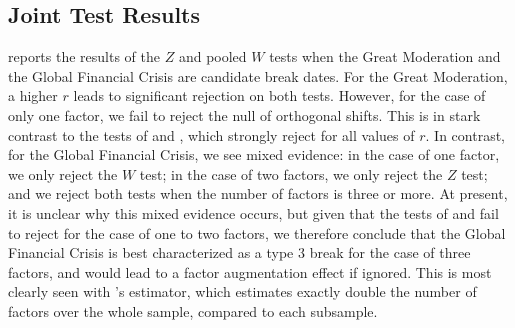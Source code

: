 \documentclass[12pt]{article}
\theoremstyle{plain}
\numberwithin{equation}{section}
\begin{document}
\subsection{Joint Test Results}
 reports the results of the $Z$ and pooled $W$ tests when the Great Moderation and the Global Financial Crisis are candidate break dates. For the Great Moderation, a higher $r$ leads to significant rejection on both tests. However, for the case of only one factor, we fail to reject the null of orthogonal shifts. This is in stark contrast to the tests of \textcite{han_tests_2015} and \textcite{baltagi_estimating_2021}, which strongly reject for all values of $r$. In contrast, for the Global Financial Crisis, we see mixed evidence: in the case of one factor, we only reject the $W$ test; in the case of two factors, we only reject the $Z$ test; and we reject both tests when the number of factors is three or more. At present, it is unclear why this mixed evidence occurs, but given that the tests of \textcite{han_tests_2015} and \textcite{baltagi_estimating_2021} fail to reject for the case of one to two factors, we therefore conclude that the Global Financial Crisis is best characterized as a type 3 break for the case of three factors, and would lead to a factor augmentation effect if ignored. This is most clearly seen with \textcite{onatski_determining_2010}'s estimator, which estimates exactly double the number of factors over the whole sample, compared to each subsample.
\end{document}
